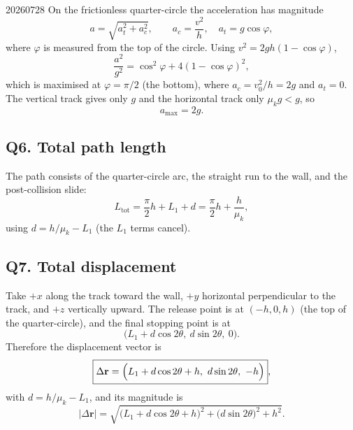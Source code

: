 \begin{solution}{20260728}
On the frictionless quarter-circle the acceleration has magnitude
\[
  a = \sqrt{a_t^{2} + a_c^{2}},
  \qquad
  a_c = \frac{v^{2}}{h}, \quad a_t = g\cos\varphi ,
\]
where $\varphi$ is measured from the top of the circle.  Using $v^{2} = 2gh(1-\cos\varphi)$,
\[
  \frac{a^{2}}{g^{2}} = \cos^{2}\varphi + 4(1-\cos\varphi)^{2},
\]
which is maximised at $\varphi = \pi/2$ (the bottom), where $a_c = v_0^{2}/h = 2g$ and $a_t = 0$.  The vertical track gives only $g$ and the horizontal track only $\mu_k g < g$, so
\[
  \boxed{a_{\max} = 2g}.
\]

\subsection*{Q6. Total path length}

The path consists of the quarter-circle arc, the straight run to the wall, and the post-collision slide:
\[
  L_{\text{tot}} = \frac{\pi}{2}h + L_1 + d
  = \boxed{\frac{\pi}{2}h + \frac{h}{\mu_k}},
\]
using $d = h/\mu_k - L_1$ (the $L_1$ terms cancel).

\subsection*{Q7. Total displacement}

Take $+x$ along the track toward the wall, $+y$ horizontal perpendicular to the track, and $+z$ vertically upward.  The release point is at $(-h, 0, h)$ (the top of the quarter-circle), and the final stopping point is at
\[
  \bigl(L_1 + d\cos 2\theta,\ d\sin 2\theta,\ 0\bigr).
\]
Therefore the displacement vector is
\[
  \boxed{\Delta\mathbf{r}
  = \Bigl(L_1 + d\cos 2\theta + h,\ d\sin 2\theta,\ -h\Bigr)},
\]
with $d = h/\mu_k - L_1$, and its magnitude is
\[
  \boxed{\lvert\Delta\mathbf{r}\rvert
  = \sqrt{\bigl(L_1 + d\cos 2\theta + h\bigr)^{2} + \bigl(d\sin 2\theta\bigr)^{2} + h^{2}}}.
\]

\end{solution}


